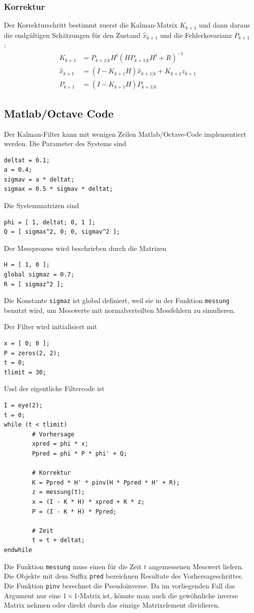 \subsubsection{Korrektur}
Der Korrekturschritt bestimmt zuerst die Kalman-Matrix $K_{k+1}$ und
dann daraus die endgültigen Schätzungen für den Zustand
$\hat x_{k+1}$ und die Fehlerkovarianz $P_{k+1}$:
\begin{align*}
K_{k+1}&=P_{k+1|k}H^t(HP_{k+1|k}H^t+R)^{-1}
\\
\hat x_{k+1}&= (I-K_{k+1}H)\hat x_{k+1|k} + K_{k+1}z_{k+1}
\\
P_{k+1}&=(I-K_{k+1}H)P_{k+1|k}
\end{align*}

\subsection{Matlab/Octave Code}
Der Kalman-Filter kann mit wenigen Zeilen Matlab/Octave-Code implementiert
werden.
Die Parameter des Systems sind
\begin{verbatim}
deltat = 0.1;
a = 0.4;
sigmav = a * deltat;
sigmax = 0.5 * sigmav * deltat;
\end{verbatim}
Die Systemmatrizen sind
\begin{verbatim}
phi = [ 1, deltat; 0, 1 ];
Q = [ sigmax^2, 0; 0, sigmav^2 ];
\end{verbatim}
Der Messprozess wird beschrieben durch die Matrizen
\begin{verbatim}
H = [ 1, 0 ];
global sigmaz = 0.7;
R = [ sigmaz^2 ];
\end{verbatim}
Die Konstante \verb+sigmaz+ ist global definiert, weil sie in der
Funktion \verb+messung+ benutzt wird, um Messwerte mit normalverteilten
Messfehlern zu simulieren.

Der Filter wird initialisiert mit
\begin{verbatim}
x = [ 0; 0 ];
P = zeros(2, 2);
t = 0;
tlimit = 30;
\end{verbatim}
Und der eigentliche Filtercode ist
\begin{verbatim}
I = eye(2);
t = 0;
while (t < tlimit)
        # Vorhersage
        xpred = phi * x;
        Ppred = phi * P * phi' + Q;

        # Korrektur
        K = Ppred * H' * pinv(H * Ppred * H' + R);
        z = messung(t);
        x = (I - K * H) * xpred + K * z;
        P = (I - K * H) * Ppred;

        # Zeit
        t = t + deltat;
endwhile
\end{verbatim}
Die Funktion \verb+messung+ muss einen für die Zeit $t$ angemessenen
Messwert liefern.
Die Objekte mit dem Suffix \verb+pred+ bezeichnen Resultate des
Vorhersageschrittes.
Die Funktion \verb+pinv+ berechnet die Pseudoinverse.
Da im vorliegenden Fall das Argument nur eine $1\times 1$-Matrix ist,
könnte man auch die gewöhnliche inverse Matrix nehmen oder direkt
durch das einzige Matrixelement dividieren.

